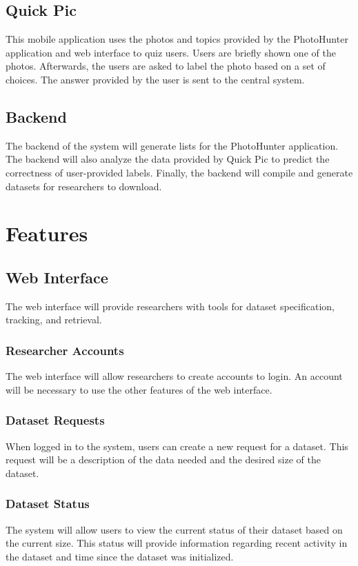 \documentclass{article}
\begin{document}
\subsection{Quick Pic}
This mobile application uses the photos and topics provided by the PhotoHunter application and web interface to quiz users. Users are briefly shown one of the photos. Afterwards, the users are asked to label the photo based on a set of choices. The answer provided by the user is sent to the central system. 

\subsection{Backend}
The backend of the system will generate lists for the PhotoHunter application. The backend will also analyze the data provided by Quick Pic to predict the correctness of user-provided labels. Finally, the backend will compile and generate datasets for researchers to download.

\section{Features}

\subsection{Web Interface}
The web interface will provide researchers with tools for dataset specification, tracking, and retrieval. 

	\subsubsection{Researcher Accounts}
	The web interface will allow researchers to create accounts to login. An account will be necessary to use the other features of the web interface.
	
	\subsubsection{Dataset Requests}
	When logged in to the system, users can create a new request for a dataset. This request will be a description of the data needed and the desired size of the dataset.
	
	\subsubsection{Dataset Status}
	The system will allow users to view the current status of their dataset based on the current size. This status will provide information regarding recent activity in the dataset and time since the dataset was initialized. 
	
\end{document}
